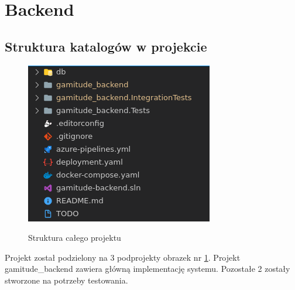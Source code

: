 \documentclass[a4paper,11pt]{report}
\begin{document}
\section{Backend}
\label{subsec:bib_back}
\subsection{Struktura katalogów w projekcie}
\begin{figure}[H]
	\centering
	\includegraphics[scale=0.7]{implementacja/backend/struktura_folderow}\\
	\caption{Struktura całego projektu}
	\label{fig:folders_back}
\end{figure}
Projekt został podzielony na 3 podprojekty obrazek nr \ref{fig:folders_back}. Projekt gamitude\_backend zawiera główną implementację systemu.
Pozostałe 2 zostały stworzone na potrzeby testowania.
\end{document}
